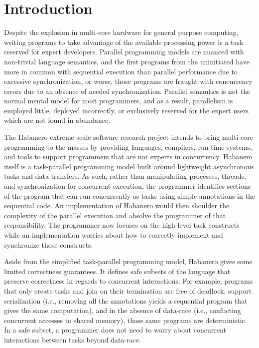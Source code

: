 \section{Introduction}
Despite the explosion in multi-core hardware for general purpose
computing, writing programs to take advantage of the available
processing power is a task reserved for expert
developers. Parallel programming models are nuanced with non-trivial 
language semantics, and the first programs from the uninitiated have
more in common with sequential execution than parallel performance due
to excessive synchronization, or worse, those programs are
fraught with concurrency errors due to an absence of needed
synchronization. Parallel semantics is not the normal mental model for
most programmers, and as a result, parallelism is employed little,
deployed incorrectly, or exclusively reserved for the expert users
which are not found in abundance.

The Habanero extreme scale software research project intends to bring
multi-core programming to the masses by providing languages,
compilers, run-time systems, and tools to support programmers that are
not experts in concurrency. Habanero itself is a task-parallel
programming model built around lightweight asynchronous tasks and data
transfers. As such, rather than manipulating processes, threads, and
synchronization for concurrent execution, the programmer identifies
sections of the program that can run concurrently as tasks using
simple annotations in the sequential code. An implementation of
Habanero would then shoulder the complexity of the parallel execution
and absolve the programmer of that responsibility. The
programmer now focuses on the high-level task constructs while an
implementation worries about how to correctly implement and
synchronize those constructs.

Aside from the simplified task-parallel programming model, Habanero
gives some limited correctness guarantees. It defines safe subsets of
the language that preserve correctness in regards to concurrent
interactions. For example, programs that only create tasks and join
on their termination are free of deadlock, support serialization (i.e.,
removing all the annotations yields a sequential program that gives
the same computation), and in the absence of data-race (i.e.,
conflicting concurrent accesses to shared memory), those same programs
are deterministic. In a safe subset, a programmer does not need to
worry about concurrent interactions between tasks beyond data-race.

